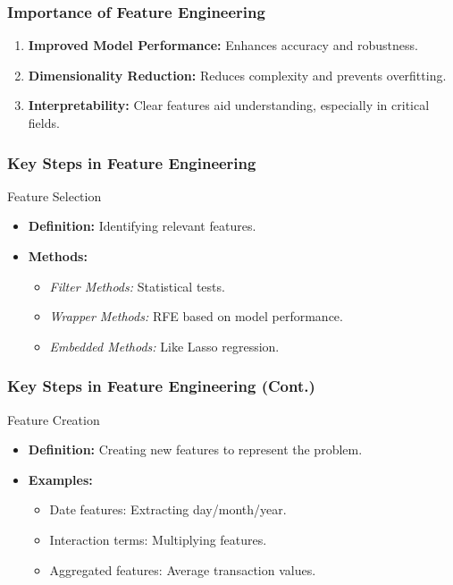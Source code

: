 \documentclass{beamer}
\begin{document}
\begin{frame}[fragile]
    \frametitle{Importance of Feature Engineering}
    \begin{enumerate}
        \item \textbf{Improved Model Performance:} Enhances accuracy and robustness.
        \item \textbf{Dimensionality Reduction:} Reduces complexity and prevents overfitting.
        \item \textbf{Interpretability:} Clear features aid understanding, especially in critical fields.
    \end{enumerate}
\end{frame}

\begin{frame}[fragile]
    \frametitle{Key Steps in Feature Engineering}
    \begin{block}{Feature Selection}
        \begin{itemize}
            \item \textbf{Definition:} Identifying relevant features.
            \item \textbf{Methods:}
            \begin{itemize}
                \item \textit{Filter Methods:} Statistical tests.
                \item \textit{Wrapper Methods:} RFE based on model performance.
                \item \textit{Embedded Methods:} Like Lasso regression.
            \end{itemize}
        \end{itemize}
    \end{block}
\end{frame}

\begin{frame}[fragile]
    \frametitle{Key Steps in Feature Engineering (Cont.)}
    \begin{block}{Feature Creation}
        \begin{itemize}
            \item \textbf{Definition:} Creating new features to represent the problem.
            \item \textbf{Examples:}
            \begin{itemize}
                \item Date features: Extracting day/month/year.
                \item Interaction terms: Multiplying features.
                \item Aggregated features: Average transaction values.
            \end{itemize}
        \end{itemize}
    \end{block}
\end{frame}
\end{document}
